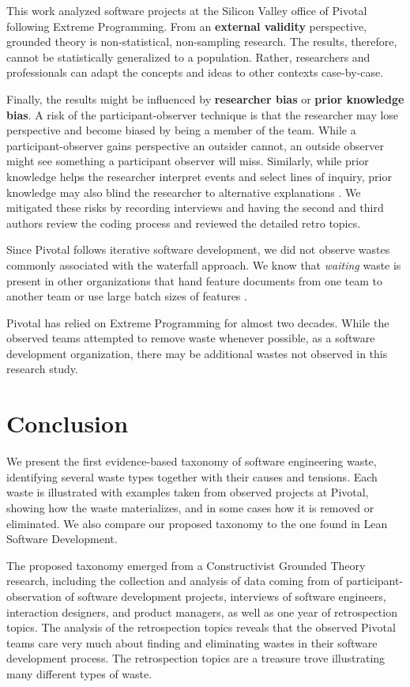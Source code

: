 This work analyzed software projects at the Silicon Valley office of Pivotal following Extreme Programming. From an \textbf{external validity} perspective, grounded theory is non-statistical, non-sampling research. The results, therefore, cannot be statistically generalized to a population. Rather, researchers and professionals can adapt the concepts and ideas to other contexts case-by-case.


Finally, the results might be influenced by \textbf{researcher bias} or \textbf{prior knowledge bias}. A risk of the participant-observer technique is that the researcher may lose perspective and become biased by being a member of the team. While a participant-observer gains perspective an outsider cannot, an outside observer might see something a participant observer will miss. Similarly, while prior knowledge helps the researcher interpret events and select lines of inquiry, prior knowledge may also blind the researcher to alternative explanations \cite{GlaserIssues}. We mitigated these risks by recording interviews and having the second and third authors review the coding process and reviewed the detailed retro topics.


Since Pivotal follows iterative software development, we did not observe wastes commonly associated with the waterfall approach. We know that \textit{waiting} waste is present in other organizations that hand feature documents from one team to another team or use large batch sizes of features \cite{Ali2016, Khurum2014, Mujtaba2010}.


Pivotal has relied on Extreme Programming for almost two decades. While the observed teams  attempted to remove waste whenever possible, as a  software development organization, there may be additional wastes not observed in this research study. 
\section{Conclusion}
\label{Conclusion}
We present the first evidence-based taxonomy of software engineering waste, identifying several waste types together with their causes and tensions. Each waste is illustrated with examples taken from observed projects at Pivotal, showing how the waste materializes, and in some cases how it is removed or eliminated. We also compare our proposed taxonomy to the one found in Lean Software Development.


The proposed taxonomy emerged from a Constructivist Grounded Theory research, including the collection and analysis of data coming from \durationOfResearchStudyPlural{} of participant-observation of  \numberOfObservedProjects{} software development projects, interviews of \numberOfInterviews{} software engineers, interaction designers, and product managers, as well as one year of retrospection topics. The analysis of the retrospection topics reveals that the observed Pivotal teams care very much about finding and eliminating wastes in their software development process. The retrospection topics are a treasure trove illustrating many different types of waste. 


